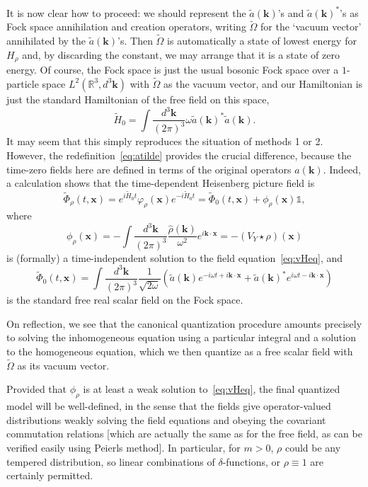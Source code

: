 \documentclass[12pt]{article}
\newcommand{\1}{\mathds{1}}                         %
\newcommand{\RR}{\mathbb{R}}           %
\newcommand{\kb}{{\boldsymbol{k}}}
\newcommand{\xb}{{\boldsymbol{x}}}
\begin{document}
	It is now clear how to proceed: we should represent the $\tilde{a}(\kb)$'s and $\tilde{a}(\kb)^*$'s as Fock space annihilation and creation operators, 
	writing $\tilde{\Omega}$ for the `vacuum vector' annihilated by the $\tilde{a}(\kb)$'s. 
	Then $\tilde{\Omega}$ is automatically a state of lowest energy for $H_\rho$ and,
	by discarding the constant, we may arrange that it is a state of zero energy.
	Of course, the Fock space is just the usual bosonic Fock space over a $1$-particle space $L^2(\RR^3,d^3\kb)$ with $\tilde{\Omega}$ as the vacuum vector, 
	and our Hamiltonian is just the standard Hamiltonian of the free field on this space,
	\[
	\tilde{H}_0=\int\frac{d^3\kb}{(2\pi)^3} \omega \tilde{a}(\kb)^*\tilde{a}(\kb) .
	\] 
	It may seem that this simply reproduces the situation of methods 1 or 2. However, the redefinition~\eqref{eq:atilde} provides the crucial difference, because the time-zero fields here are defined in terms of the original operators $a(\kb)$. Indeed, a calculation shows that 
	the time-dependent Heisenberg picture field is
	\begin{equation}
	\tilde{\Phi}_\rho(t,\xb) = e^{i\tilde{H}_0 t}\varphi_\rho(\xb)e^{-i\tilde{H}_0 t} = \tilde{\Phi}_0(t,\xb) + \phi_\rho(\xb)\mathbb{1},
	\end{equation}
	where 
	\begin{equation}
	\phi_\rho(\xb) = -\int\frac{d^3\kb}{(2\pi)^3}\frac{\hat{\rho}(\kb)}{\omega^2} e^{i\kb\cdot\xb} = -(V_Y\star\rho)(\xb)
	\end{equation}
	is (formally) a time-independent solution to the field equation~\eqref{eq:vHeq}, and
	\begin{equation}
	\tilde{\Phi}_0(t,\xb) = \int\frac{d^3\kb}{(2\pi)^3}\frac{1}{\sqrt{2\omega}}
	(\tilde{a}(\kb)e^{-i\omega t + i\kb\cdot\xb} + \tilde{a}(\kb)^*e^{i\omega t - i\kb\cdot\xb})
	\end{equation} 
	is the standard free real scalar field on the Fock space.
	
	On reflection, we see that the canonical quantization procedure amounts precisely to solving the inhomogeneous equation using a particular integral and a solution to the homogeneous equation, which we then quantize as
	a free scalar field with $\tilde{\Omega}$ as its vacuum vector.	
		
	Provided that $\phi_\rho$ is at least a weak solution to~\eqref{eq:vHeq}, the final quantized model will be well-defined, in the sense that the fields give operator-valued distributions weakly solving the field equations and obeying the covariant commutation relations [which are actually the same as for the free field, as can be verified easily using Peierls method]. In particular, for $m>0$, $\rho$ could be any tempered distribution, so linear combinations of $\delta$-functions, or $\rho\equiv 1$ are certainly permitted.
			
\end{document}
